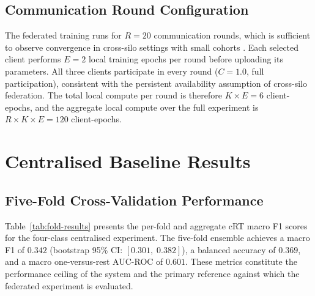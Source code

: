 \subsection{Communication Round Configuration}
\label{sec:round-config}

The federated training runs for $R = 20$ communication
rounds, which is sufficient to observe convergence in
cross-silo settings with small cohorts
\cite{sheller2020federated}.
Each selected client performs $E = 2$ local training epochs
per round before uploading its parameters.
All three clients participate in every round ($C = 1.0$,
full participation), consistent with the persistent
availability assumption of cross-silo federation.
The total local compute per round is therefore
$K \times E = 6$ client-epochs, and the aggregate local
compute over the full experiment is $R \times K \times E
= 120$ client-epochs.


\section{Centralised Baseline Results}
\label{sec:centralised-results}

\subsection{Five-Fold Cross-Validation Performance}
\label{sec:fivefold-results}

Table~\ref{tab:fold-results} presents the per-fold and
aggregate cRT macro F1 scores for the four-class
centralised experiment.
The five-fold ensemble achieves a macro F1 of $0.342$
(bootstrap 95\% CI: $[0.301,\; 0.382]$), a balanced
accuracy of $0.369$, and a macro one-versus-rest AUC-ROC
of $0.601$.
These metrics constitute the performance ceiling of the
system and the primary reference against which the
federated experiment is evaluated.

